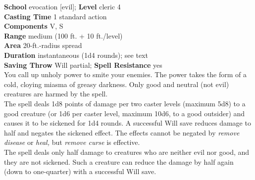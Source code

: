 \textbf{School} evocation [evil]; \textbf{Level} cleric 4\\
\textbf{Casting Time} 1 standard action\\
\textbf{Components} V, S\\
\textbf{Range }medium (100 ft. + 10 ft./level)\\
\textbf{Area} 20-ft.-radius spread\\
\textbf{Duration} instantaneous (1d4 rounds); see text\\
\textbf{Saving Throw }Will partial; \textbf{Spell Resistance} yes\\
You call up unholy power to smite your enemies. The power takes the form of a cold, cloying miasma of greasy darkness. Only good and neutral (not evil) creatures are harmed by the spell.\\
The spell deals 1d8 points of damage per two caster levels (maximum 5d8) to a good creature (or 1d6 per caster level, maximum 10d6, to a good outsider) and causes it to be sickened for 1d4 rounds. A successful Will save reduces damage to half and negates the sickened effect. The effects cannot be negated by \textit{remove disease }or \textit{heal, }but \textit{remove curse }is effective.\\
The spell deals only half damage to creatures who are neither evil nor good, and they are not sickened. Such a creature can reduce the damage by half again (down to one-quarter) with a successful Will save.\\
